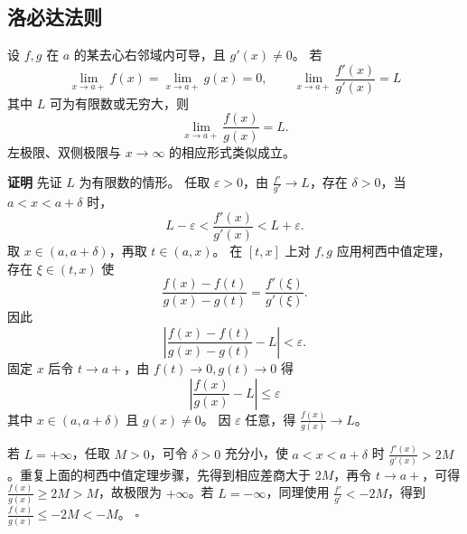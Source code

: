 \documentclass[fontset=fandol]{ctexart}
\newenvironment{proofdetail}{\par\noindent\textbf{证明}\quad}{\hfill$\square$\par\vspace{0.8em}}
\begin{document}
\subsection{洛必达法则}

\begin{theorem}[洛必达法则：$0/0$ 型]
设 $f,g$ 在 $a$ 的某去心右邻域内可导，且 $g'(x)\neq0$。 若
\[
\lim_{x\to a+}f(x)=\lim_{x\to a+}g(x)=0,\qquad
\lim_{x\to a+}\frac{f'(x)}{g'(x)}=L
\]
其中 $L$ 可为有限数或无穷大，则
\[
\lim_{x\to a+}\frac{f(x)}{g(x)}=L.
\]
左极限、双侧极限与 $x\to\infty$ 的相应形式类似成立。
\end{theorem}
\begin{proofdetail}
先证 $L$ 为有限数的情形。 任取 $\varepsilon>0$，由 $\frac{f'}{g'}\to L$，存在 $\delta>0$，当 $a<x<a+\delta$ 时，
\[
L-\varepsilon<\frac{f'(x)}{g'(x)}<L+\varepsilon.
\]
取 $x\in(a,a+\delta)$，再取 $t\in(a,x)$。 在 $[t,x]$ 上对 $f,g$ 应用柯西中值定理，存在 $\xi\in(t,x)$ 使
\[
\frac{f(x)-f(t)}{g(x)-g(t)}=\frac{f'(\xi)}{g'(\xi)}.
\]
因此
\[
\left|\frac{f(x)-f(t)}{g(x)-g(t)}-L\right|<\varepsilon.
\]
固定 $x$ 后令 $t\to a+$，由 $f(t)\to0,g(t)\to0$ 得
\[
\left|\frac{f(x)}{g(x)}-L\right|\leq\varepsilon
\]
其中 $x\in(a,a+\delta)$ 且 $g(x)\neq0$。 因 $\varepsilon$ 任意，得 $\frac{f(x)}{g(x)}\to L$。

若 $L=+\infty$，任取 $M>0$，可令 $\delta>0$ 充分小，使 $a<x<a+\delta$ 时 $\frac{f'(x)}{g'(x)}>2M$。重复上面的柯西中值定理步骤，先得到相应差商大于 $2M$，再令 $t\to a+$，可得 $\frac{f(x)}{g(x)}\geq2M>M$，故极限为 $+\infty$。若 $L=-\infty$，同理使用 $\frac{f'}{g'}<-2M$，得到 $\frac{f(x)}{g(x)}\leq-2M<-M$。
\end{proofdetail}
\end{document}

